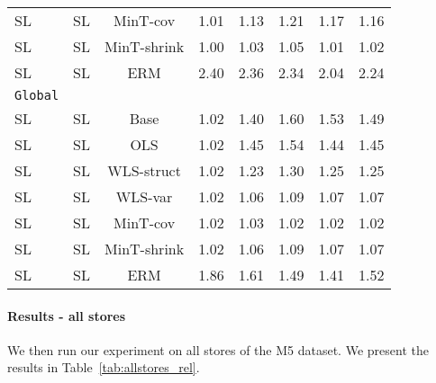 \documentclass[preprint, 3p, times, twocolumn]{elsarticle}
\begin{document}
\begin{table*}[t]
\begin{center}
\begin{tabular}{l c  cccccc}
    \hspace{0.1cm} 	SL	&SL	&MinT-cov	&1.01	&1.13	&1.21	&1.17	&1.16	\\
    \hspace{0.1cm} 	SL	&SL	&MinT-shrink	&1.00	&1.03	&1.05	&1.01	&1.02	\\
    \hspace{0.1cm} 	SL	&SL	&ERM	&2.40	&2.36	&2.34	&2.04	&2.24	\\
    \midrule									
    \texttt{Global}									\\
    \hspace{0.1cm} 	SL	&SL	&Base	&1.02	&1.40	&1.60	&1.53	&1.49	\\
    \hspace{0.1cm} 	SL	&SL	&OLS	&1.02	&1.45	&1.54	&1.44	&1.45	\\
    \hspace{0.1cm} 	SL	&SL	&WLS-struct	&1.02	&1.23	&1.30	&1.25	&1.25	\\
    \hspace{0.1cm} 	SL	&SL	&WLS-var	&1.02	&1.06	&1.09	&1.07	&1.07	\\
    \hspace{0.1cm} 	SL	&SL	&MinT-cov	&1.02	&1.03	&1.02	&1.02	&1.02	\\
    \hspace{0.1cm} 	SL	&SL	&MinT-shrink	&1.02	&1.06	&1.09	&1.07	&1.07	\\
    \hspace{0.1cm} 	SL	&SL	&ERM	&1.86	&1.61	&1.49	&1.41	&1.52	\\
    
    \bottomrule
    \end{tabular}
    \end{center}
    \end{table*}

  \paragraph{Results - all stores} We then run our experiment on all stores of the M5 dataset. We present the results in Table~\ref{tab:allstores_rel}.
\end{document}
